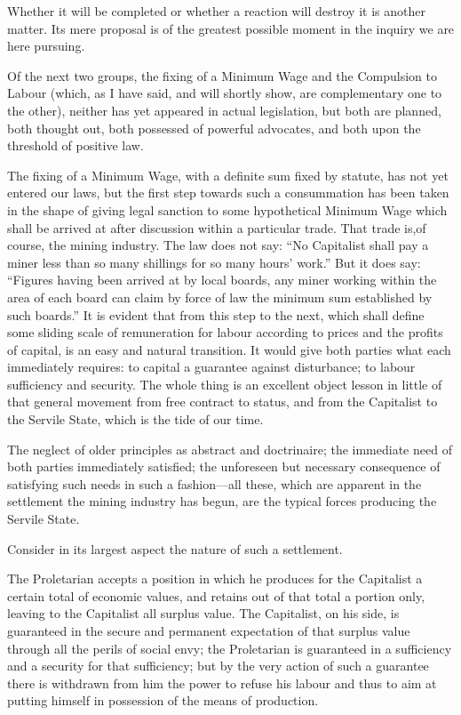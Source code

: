 \documentclass{book}
\begin{document}
Whether it will be completed or whether a reaction will destroy it is another matter. Its mere proposal is of the greatest possible moment in the inquiry we are here pursuing.

Of the next two groups, the fixing of a Minimum Wage and the Compulsion to Labour (which, as I have said, and will shortly show, are complementary one to the other), neither has yet appeared in actual legislation, but both are planned, both thought out, both possessed of powerful advocates, and both upon the threshold of positive law.

The fixing of a Minimum Wage, with a definite sum fixed by statute, has not yet entered our laws, but the first step towards such a consummation has been taken in the shape of giving legal sanction to some hypothetical Minimum Wage which shall be arrived at after discussion within a particular trade. That trade is,of course, the mining industry. The law does not say: “No Capitalist shall pay a miner less than so many shillings for so many hours’ work.” But it does say: “Figures having been arrived at by local boards, any miner working within the area of each board can claim by force of law the minimum sum established by such boards.” It is evident that from this step to the next, which shall define some sliding scale of remuneration for labour according to prices and the profits of capital, is an easy and natural transition. It would give both parties what each immediately requires: to capital a guarantee against disturbance; to labour sufficiency and security. The whole thing is an excellent object lesson in little of that general movement from free contract to status, and from the Capitalist to the Servile State, which is the tide of our time.

The neglect of older principles as abstract and doctrinaire; the immediate need of both parties immediately satisfied; the unforeseen but necessary consequence of satisfying such needs in such a fashion—all these, which are apparent in the settlement the mining industry has begun, are the typical forces producing the Servile State.

Consider in its largest aspect the nature of such a settlement.

The Proletarian accepts a position in which he produces for the Capitalist a certain total of economic values, and retains out of that total a portion only, leaving to the Capitalist all surplus value. The Capitalist, on his side, is guaranteed in the secure and permanent expectation of that surplus value through all the perils of social envy; the Proletarian is guaranteed in a sufficiency and a security for that sufficiency; but by the very action of such a guarantee there is withdrawn from him the power to refuse his labour and thus to aim at putting himself in possession of the means of production.
\end{document}
